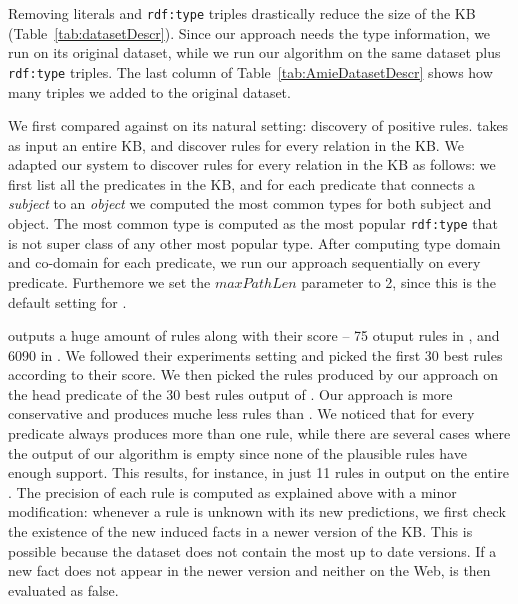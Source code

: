 Removing literals and \texttt{rdf:type} triples drastically reduce the size of the KB (Table~\ref{tab:datasetDescr}). Since our approach needs the type information, we run \amie on its original dataset, while we run our algorithm on the same dataset plus \texttt{rdf:type} triples. The last column of Table~\ref{tab:AmieDatasetDescr} shows how many triples we added to the original \amie dataset.

 We first compared against \amie on its natural setting: discovery of positive rules. \amie takes as input an entire KB, and discover rules for every relation in the KB. We adapted our system to discover rules for every relation in the KB as follows: we first list all the predicates in the KB, and for each predicate that connects a \emph{subject} to an \emph{object} we computed the most common types for both subject and object. The most common type is computed as the most popular \texttt{rdf:type} that is not super class of any other most popular type. After computing type domain and co-domain for each predicate, we run our approach sequentially on every predicate. Furthemore we set the $maxPathLen$ parameter to 2, since this is the default setting for \amie.

\amie outputs a huge amount of rules along with their score -- 75 otuput rules in \yago, and 6090 in \dbpedia. We followed their experiments setting and picked the first 30 best rules according to their score. We then picked the rules produced by our approach on the head predicate of the 30 best rules output of \amie. Our approach is more conservative and produces muche less rules than \amie. We noticed that for every predicate \amie always produces more than one rule, while there are several cases where the output of our algorithm is empty since none of the plausible rules have enough support. This results, for instance, in just 11 rules in output on the entire \yago. The precision of each rule is computed as explained above with a minor modification: whenever a rule is unknown with its new predictions, we first check the existence of the new induced facts in a newer version of the KB. This is possible because the dataset does not contain the most up to date versions. If a new fact does not appear in the newer version and neither on the Web, is then evaluated as false.

